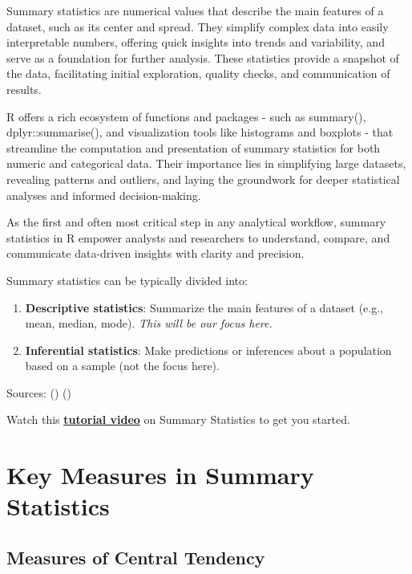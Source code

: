 \documentclass[
  man,
  floatsintext,
  longtable,
  nolmodern,
  notxfonts,
  notimes,
  colorlinks=true,linkcolor=blue,citecolor=blue,urlcolor=blue]{apa7}
\begin{document}
Summary statistics are numerical values that describe the main features
of a dataset, such as its center and spread. They simplify complex data
into easily interpretable numbers, offering quick insights into trends
and variability, and serve as a foundation for further analysis. These
statistics provide a snapshot of the data, facilitating initial
exploration, quality checks, and communication of results.

R offers a rich ecosystem of functions and packages - such as summary(),
dplyr::summarise(), and visualization tools like histograms and boxplots
- that streamline the computation and presentation of summary statistics
for both numeric and categorical data. Their importance lies in
simplifying large datasets, revealing patterns and outliers, and laying
the groundwork for deeper statistical analyses and informed
decision-making.

As the first and often most critical step in any analytical workflow,
summary statistics in R empower analysts and researchers to understand,
compare, and communicate data-driven insights with clarity and
precision.

Summary statistics can be typically divided into:

\begin{enumerate}
\def\labelenumi{\arabic{enumi}.}
\item
  \textbf{Descriptive statistics}: Summarize the main features of a
  dataset (e.g., mean, median, mode). \emph{This will be our focus
  here.}
\item
  \textbf{Inferential statistics}: Make predictions or inferences about
  a population based on a sample (not the focus here).
\end{enumerate}

Sources: ()
()

Watch this
\href{https://www.youtube.com/watch?v=yoPGwvUzjgQ}{\textbf{tutorial
video}} on Summary Statistics to get you started.

\newpage

\section{Key Measures in Summary
Statistics}\label{key-measures-in-summary-statistics}

\subsection{Measures of Central
Tendency}\label{measures-of-central-tendency}
\end{document}
